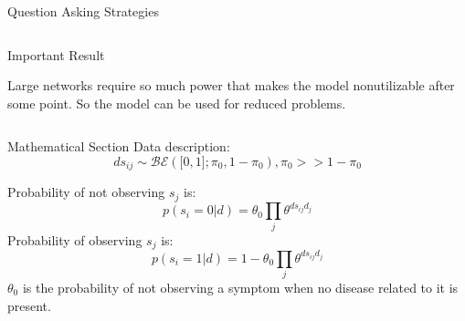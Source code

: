 \documentclass[final]{beamer}
\newlength{\onecolwid}
\newlength{\twocolwid}
\begin{document}
\begin{frame}
\begin{columns}[t]
\begin{column}{\twocolwid}
\begin{columns}[t,totalwidth=\twocolwid]
\begin{column}{\onecolwid}
\begin{exampleblock}{Question Asking Strategies}
\end{exampleblock}



\end{column} %

\end{columns} %



\begin{alertblock}{Important Result}

Large networks require so much power that makes the model nonutilizable after some point. So the model can be used for reduced problems.

\end{alertblock} 


\begin{columns}[t,totalwidth=\twocolwid] %

\begin{column}{\onecolwid} %


\begin{exampleblock}{Mathematical Section}
Data description:
\begin{equation}
ds_{ij}\sim \mathcal{BE}(\big[0,1\big]; \pi_{0}, 1-\pi_{0}), \pi_{0}>>1-\pi_{0}
\end{equation}

Probability of not observing $s_{j}$ is:
\begin{equation*}
p(s_{i}=0|d) = \theta_{0}\prod_{j}\theta^{ds_{ij}d_{j}}
\end{equation*}
Probability of observing $s_{j}$ is:
\begin{equation*}
p(s_{i}=1|d) = 1- \theta_{0}\prod_{j}\theta^{ds_{ij}d_{j}}
\end{equation*}
$\theta_{0}$ is the probability of not observing a symptom when no disease related to it is present.
\\


\end{exampleblock}
\end{column}
\end{columns}
\end{column}
\end{columns}
\end{frame}
\end{document}
